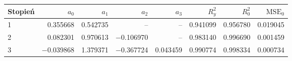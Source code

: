 \begin{tabular}{lrrrrrrr}
\toprule
Stopień & $a_0$ & $a_1$ & $a_2$ & $a_3$ & $R_y^2$ & $R_0^2$ & $\mathrm{MSE}_0$ \\
\midrule
1 & \num{0.355668} & \num{0.542735} & -- & -- & \num{0.941099} & \num{0.956780} & \num{0.019045} \\
2 & \num{0.082301} & \num{0.970613} & \num{-0.106970} & -- & \num{0.983140} & \num{0.996690} & \num{0.001459} \\
3 & \num{-0.039868} & \num{1.379371} & \num{-0.367724} & \num{0.043459} & \num{0.990774} & \num{0.998334} & \num{0.000734} \\
\bottomrule
\end{tabular}
